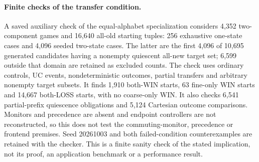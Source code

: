 \paragraph{Finite checks of the transfer condition.}
A saved auxiliary check of the equal-alphabet specialization considers 4,352 two-component games and 16,640 all-old starting tuples: 256 exhaustive one-state cases and 4,096 seeded two-state cases. The latter are the first 4,096 of 10,695 generated candidates having a nonempty quiescent all-new target set; 6,599 outside that domain are retained as excluded counts. The check uses ordinary controls, UC events, nondeterministic outcomes, partial transfers and arbitrary nonempty target subsets. It finds 1,910 both-WIN starts, 63 fine-only WIN starts and 14,667 both-LOSS starts, with no coarse-only WIN. It also checks 6,541 partial-prefix quiescence obligations and 5,124 Cartesian outcome comparisons. Monitors and precedence are absent and endpoint controllers are not reconstructed, so this does not test the commuting-monitor, precedence or frontend premises. Seed 20261003 and both failed-condition counterexamples are retained with the checker. This is a finite sanity check of the stated implication, not its proof, an application benchmark or a performance result.
